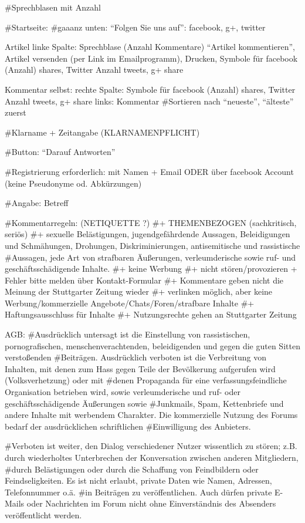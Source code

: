 #Sprechblasen mit Anzahl

#Startseite: 
#gaaanz unten: ``Folgen Sie uns auf'': facebook, g+, twitter

Artikel linke Spalte: 
Sprechblase (Anzahl Kommentare) ``Artikel kommentieren'', Artikel versenden (per Link im Emailprogramm), Drucken, Symbole für facebook  (Anzahl) shares, Twitter Anzahl tweets, g+ share

Kommentar selbst: 
rechte Spalte: Symbole für facebook  (Anzahl) shares, Twitter Anzahl tweets, g+ share
links: Kommentar
#Sortieren nach ``neueste'', ``älteste'' zuerst

#Klarname + Zeitangabe (KLARNAMENPFLICHT)

#Button: ``Darauf Antworten''

#Registrierung erforderlich: mit Namen + Email  ODER über facebook Account (keine Pseudonyme od. Abkürzungen)

#Angabe: Betreff

#Kommentarregeln: (NETIQUETTE ?)
#+ THEMENBEZOGEN (sachkritisch, seriös)
#+ sexuelle Belästigungen, jugendgefährdende Aussagen, Beleidigungen und Schmähungen, Drohungen, Diskriminierungen, antisemitische und rassistische #Aussagen, jede Art von strafbaren Äußerungen, verleumderische sowie ruf- und geschäftsschädigende Inhalte.
#+ keine Werbung
#+ nicht stören/provozieren
+ Fehler bitte melden über Kontakt-Formular
#+ Kommentare geben nicht die Meinung der Stuttgarter Zeitung wieder
#+ verlinken möglich, aber keine Werbung/kommerzielle Angebote/Chats/Foren/strafbare Inhalte
#+ Haftungsausschluss für Inhalte 
#+ Nutzungsrechte gehen an Stuttgarter Zeitung


AGB:
#Ausdrücklich untersagt ist die Einstellung von rassistischen, pornografischen, menschenverachtenden, beleidigenden und gegen die guten Sitten verstoßenden #Beiträgen. Ausdrücklich verboten ist die Verbreitung von Inhalten, mit denen zum Hass gegen Teile der Bevölkerung aufgerufen wird (Volksverhetzung) oder mit #denen Propaganda für eine verfassungsfeindliche Organisation betrieben wird, sowie verleumderische und ruf- oder geschäftsschädigende Äußerungen sowie #Junkmails, Spam, Kettenbriefe und andere Inhalte mit werbendem Charakter. Die kommerzielle Nutzung des Forums bedarf der ausdrücklichen schriftlichen #Einwilligung des Anbieters.

#Verboten ist weiter, den Dialog verschiedener Nutzer wissentlich zu stören; z.B. durch wiederholtes Unterbrechen der Konversation zwischen anderen Mitgliedern, #durch Belästigungen oder durch die Schaffung von Feindbildern oder Feindseligkeiten. Es ist nicht erlaubt, private Daten wie Namen, Adressen, Telefonnummer o.ä. #in Beiträgen zu veröffentlichen. Auch dürfen private E-Mails oder Nachrichten im Forum nicht ohne Einverständnis des Absenders veröffentlicht werden.

